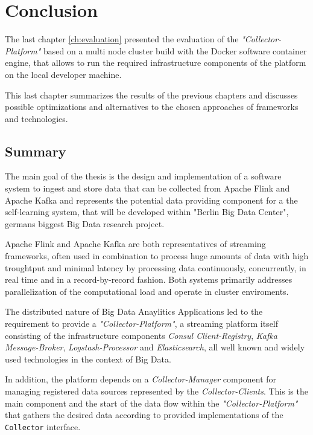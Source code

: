 \chapter{Conclusion}
\label{ch:conclusion}

The last chapter \autoref{ch:evaluation} presented the evaluation of the \textit{"Collector-Platform"} based on a multi node cluster
build with the Docker software container engine, that allows to run the required infrastructure components of the platform
on the local developer machine.

This last chapter summarizes the results of the previous chapters and discusses possible optimizations and alternatives to
the chosen approaches of frameworks and technologies.

\section{Summary}

The main goal of the thesis is the design and implementation of a software system
to ingest and store data that can be collected from Apache Flink and Apache Kafka and
represents the potential data providing component for a the self-learning system, that will be developed
within "Berlin Big Data Center", germans biggest Big Data research project.

Apache Flink and Apache Kafka are both representatives of streaming frameworks, often used in combination to
process huge amounts of data with high troughtput and minimal latency by processing data continuously,
concurrently, in real time and in a record-by-record fashion. Both systems primarily addresses parallelization of the computational load
and operate in cluster enviroments.

The distributed nature of Big Data Anaylitics Applications led to the requirement to provide a \textit{"Collector-Platform"}, a
streaming platform itself consisting of the infrastructure components \textit{Consul Client-Registry}, \textit{Kafka Message-Broker},
\textit{Logstash-Processor} and \textit{Elasticsearch}, all well known and widely used technologies in the context of Big Data.

In addition, the platform depends on a \textit{Collector-Manager} component for managing registered data sources represented
by the \textit{Collector-Clients}. This is the main component and the start of the data flow within the \textit{"Collector-Platform"}
that gathers the desired data according to provided implementations of the \verb|Collector| interface.

